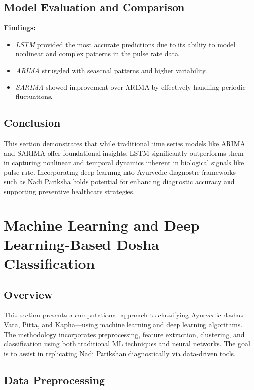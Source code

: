 \documentclass[10pt,twocolumn]{article}
\begin{document}
\subsection{Model Evaluation and Comparison}
\textbf{Findings:}
\begin{itemize}
    \item \textit{LSTM} provided the most accurate predictions due to its ability to model nonlinear and complex patterns in the pulse rate data.
    \item \textit{ARIMA} struggled with seasonal patterns and higher variability.
    \item \textit{SARIMA} showed improvement over ARIMA by effectively handling periodic fluctuations.
\end{itemize}

\subsection{Conclusion}

This section demonstrates that while traditional time series models like ARIMA and SARIMA offer foundational insights, LSTM significantly outperforms them in capturing nonlinear and temporal dynamics inherent in biological signals like pulse rate. Incorporating deep learning into Ayurvedic diagnostic frameworks such as Nadi Pariksha holds potential for enhancing diagnostic accuracy and supporting preventive healthcare strategies.

\section{Machine Learning and Deep Learning-Based Dosha Classification}

\subsection{Overview}

This section presents a computational approach to classifying Ayurvedic doshas—Vata, Pitta, and Kapha—using machine learning and deep learning algorithms. The methodology incorporates preprocessing, feature extraction, clustering, and classification using both traditional ML techniques and neural networks. The goal is to assist in replicating Nadi Parikshan diagnostically via data-driven tools.

\subsection{Data Preprocessing}
\end{document}
